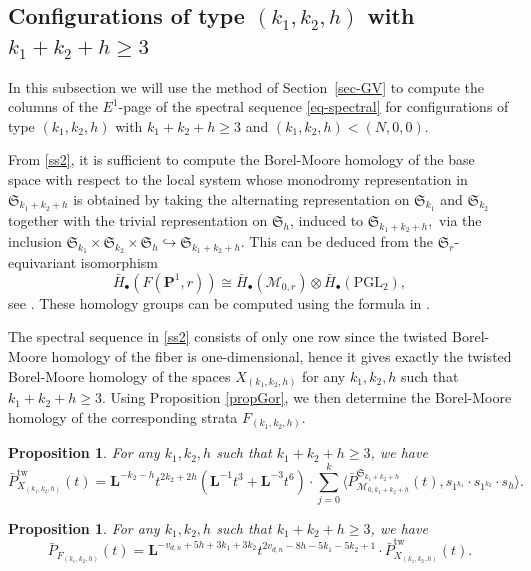 \documentclass[10pt,a4paper,twoside]{amsart}
\theoremstyle{plain}
\newtheorem{prop}[theo]{Proposition}
\theoremstyle{definition}
\theoremstyle{remark}
\begin{document}
\subsection{Configurations of type $(k_1,k_2,h)$ with $k_1+k_2+h\geq3$} \label{sec-config2}
In this subsection we will use the method of Section~\ref{sec-GV} to compute the columns of the $E^1$-page of the spectral sequence \eqref{eq-spectral} for configurations of type $(k_1,k_2,h)$ with 
$k_1+k_2+h\geq 3$ and $(k_1,k_2,h) <(N,0,0)$. 

From \eqref{ss2}, it is sufficient to compute the Borel-Moore homology of the base space with respect to the local system whose monodromy representation in $\mathfrak{S}_{k_1+k_2+h}$ is obtained by taking the alternating representation on $\mathfrak{S}_{k_1}$ and $\mathfrak{S}_{k_2}$ together with the trivial representation on $\mathfrak{S}_h$, induced to $\mathfrak{S}_{k_1+k_2+h},$ via the inclusion $\mathfrak{S}_{k_1}\times\mathfrak{S}_{k_2}\times\mathfrak{S}_h\hookrightarrow\mathfrak{S}_{k_1+k_2+h}$.  
This can be deduced from the $\mathfrak{S}_r\mbox{-}$equivariant isomorphism 
$$\bar{H}_\bullet(F(\mathbf{P}^1,r))\cong\bar{H}_\bullet(\mathcal{M}_{0,r})\otimes\bar{H}_\bullet(\mathrm{PGL}_2),$$
see \cite{Get}.
These homology groups 
can be computed using the formula in \cite[Theorem 2.9]{KL}. 

The spectral sequence in \eqref{ss2} consists of only one row since the twisted Borel-Moore homology of the fiber is one-dimensional, hence it gives exactly the twisted Borel-Moore homology of the spaces $X_{(k_1,k_2,h)}$ for any $k_1,k_2,h$ such that $k_1+k_2+h \geq 3$. 
Using Proposition \ref{propGor}, we then determine the Borel-Moore homology of the corresponding strata $F_{(k_1,k_2,h)}$.

\begin{prop}\label{propConfig} 
For any $k_1,k_2,h$ such that $k_1+k_2+h \geq 3$, we have 
\begin{equation*}
\bar{P}^{\mathrm{tw}}_{X_{(k_1,k_2,h)}}(t)=
\mathbf{L}^{-k_2-h}t^{2k_2+2h}(\mathbf{L}^{-1}t^3+\mathbf{L}^{-3}t^6)\cdot\sum_{j=0}^k\langle\bar{P}_{\mathcal{M}_{0,k_1+k_2+h}}^{\mathfrak{S}_{k_1+k_2+h}}(t),s_{1^{k_1}}\cdot s_{1^{k_2}}\cdot s_h\rangle.
\end{equation*}
\end{prop}

\begin{prop}\label{propStrata}
For any $k_1,k_2,h$ such that $k_1+k_2+h \geq 3$, we have 
\begin{equation*}
\bar{P}_{F_{(k_1,k_2,h)}}(t)=\mathbf{L}^{-v_{d,n}+5h+3k_1+3k_2}t^{2v_{d,n}-8h-5k_1-5k_2+1}\cdot\bar{P}^{\mathrm{tw}}_{X_{(k_1,k_2,h)}}(t).
\end{equation*}
\end{prop}
\end{document}
